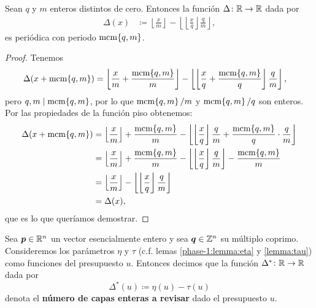 \begin{lemma}
	\label{lemma:layer-dist}
	Sean $q$ y $m$ enteros distintos de cero. Entonces la función $\Delta \colon \mathbb{R} \to \mathbb{R}$ dada por
	\begin{align*}
		\Delta(x) &\coloneq \left\lfloor \frac{x}{m} \right\rfloor - \left\lfloor \left\lfloor
		\frac{x}{q} \right\rfloor \frac{q}{m} \right\rfloor,
	\end{align*}
	es periódica con periodo $\mathop{\mathrm{mcm}{\left\lbrace q, m \right\rbrace}}$.
\end{lemma}
\begin{proof}
	Tenemos
	\begin{align*}
		\Delta(x + \mathop{\mathrm{mcm}{\left\lbrace q, m \right\rbrace}})
		&= \left\lfloor \frac{x}{m} + \frac{\mathop{\mathrm{mcm}{\left\lbrace q, m \right\rbrace}}}{m} \right\rfloor
		- \left\lfloor \left\lfloor \frac{x}{q} + \frac{\mathop{\mathrm{mcm}{\left\lbrace q,m \right\rbrace}}}{q} \right\rfloor \frac{q}{m}
			\right\rfloor,
	\end{align*}
	pero $q, m \mid \mathop{\mathrm{mcm}{\left\lbrace q, m \right\rbrace}}$, por lo que $\mathop{\mathrm{mcm}{\left\lbrace q,m \right\rbrace}}/m$ y $\mathop{\mathrm{mcm}{\left\lbrace q,m \right\rbrace}}/q$ son enteros. Por las
	propiedades de la función piso obtenemos:
	\begin{align*}
		\Delta(x + \mathop{\mathrm{mcm}{\left\lbrace q,m \right\rbrace}})
		&=
		\left\lfloor \frac{x}{m} \right\rfloor + \frac{\mathop{\mathrm{mcm}{\left\lbrace q,m \right\rbrace}}}{m}
		- \left\lfloor \left\lfloor \frac{x}{q} \right\rfloor\frac{q}{m} + 
			\frac{\mathop{\mathrm{mcm}{\left\lbrace q,m \right\rbrace}}}{q}\cdot\frac{q}{m} \right\rfloor \\
		&= 
		\left\lfloor \frac{x}{m} \right\rfloor + \frac{\mathop{\mathrm{mcm}{\left\lbrace q,m \right\rbrace}}}{m}
		- \left\lfloor \left\lfloor \frac{x}{q} \right\rfloor\frac{q}{m}\right\rfloor
		- \frac{\mathop{\mathrm{mcm}{\left\lbrace q,m \right\rbrace}}}{m} \\
		&= 
		\left\lfloor \frac{x}{m} \right\rfloor
		- \left\lfloor \left\lfloor \frac{x}{q} \right\rfloor\frac{q}{m}\right\rfloor \\
		&= \Delta(x),
	\end{align*}
	que es lo que queríamos demostrar.
\end{proof}
\begin{definition}
	Sea $\boldsymbol{p} \in \mathbb{R}^n$ un vector esencialmente entero y sea $\boldsymbol{q} \in \mathbb{Z}^n$ su múltiplo
	coprimo. Consideremos los parámetros $\eta$ y $\tau$ (c.f. lemas \ref{phase-1:lemma:eta} y
	\ref{lemma:tau}) como funciones del presupuesto $u$. Entonces decimos que la función $\Delta^*
	\colon \mathbb{R} \to \mathbb{R}$ dada por
	\begin{equation}
		\label{eq:dist-layers}
		\Delta^*(u) \coloneq \eta(u) - \tau(u)
	\end{equation}
	denota el \textbf{número de capas enteras a revisar} dado el presupuesto $u$.
\end{definition}

